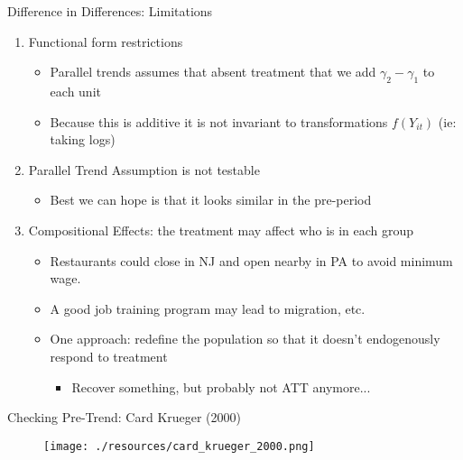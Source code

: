 \begin{frame}{Difference in Differences: Limitations}
\begin{enumerate}
\item Functional form restrictions
\begin{itemize}
\item \alert{Parallel trends} assumes that absent treatment that we add $\gamma_2 - \gamma_1$ to each unit
\item Because this is \alert{additive} it is not invariant to transformations $f(Y_{it})$ (ie: taking logs)
\end{itemize}
\item Parallel Trend Assumption is \alert{not testable}
\begin{itemize}
\item Best we can hope is that it looks similar in the pre-period
\end{itemize}
\item Compositional Effects: the treatment may affect who is in each group
\begin{itemize}
\item Restaurants could close in NJ and open nearby in PA to avoid minimum wage.
\item A good job training program may lead to migration, etc.
\item One approach: redefine the population so that it doesn't endogenously respond to treatment
\begin{itemize}
\item Recover something, but probably not ATT anymore...
\end{itemize}

\end{itemize}

\end{enumerate}

\end{frame}

\begin{frame}{Checking Pre-Trend: Card Krueger (2000)}
\begin{figure}
\centering
\texttt{[image: ./resources/card\_krueger\_2000.png]}
\end{figure}
\end{frame}



